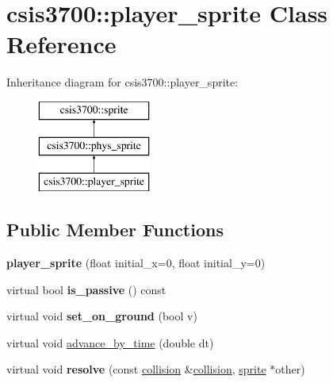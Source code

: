 \hypertarget{classcsis3700_1_1player__sprite}{\section{csis3700\-:\-:player\-\_\-sprite Class Reference}
\label{classcsis3700_1_1player__sprite}
}
Inheritance diagram for csis3700\-:\-:player\-\_\-sprite\-:\begin{figure}[H]
\begin{center}
\leavevmode
\includegraphics[height=3.000000cm]{classcsis3700_1_1player__sprite}
\end{center}
\end{figure}
\subsection*{Public Member Functions}
\begin{DoxyCompactItemize}
\item 
\hypertarget{classcsis3700_1_1player__sprite_ac187a629d01d5499a19a96e10c132aab}{{\bfseries player\-\_\-sprite} (float initial\-\_\-x=0, float initial\-\_\-y=0)}\label{classcsis3700_1_1player__sprite_ac187a629d01d5499a19a96e10c132aab}

\item 
\hypertarget{classcsis3700_1_1player__sprite_a3c25365425b909f164234f5cd6391ecc}{virtual bool {\bfseries is\-\_\-passive} () const }\label{classcsis3700_1_1player__sprite_a3c25365425b909f164234f5cd6391ecc}

\item 
\hypertarget{classcsis3700_1_1player__sprite_a2fc12d698304e7db48bee063e2cde2be}{virtual void {\bfseries set\-\_\-on\-\_\-ground} (bool v)}\label{classcsis3700_1_1player__sprite_a2fc12d698304e7db48bee063e2cde2be}

\item 
virtual void \hyperlink{classcsis3700_1_1player__sprite_ac2453e0b3934ac639d704c4ecca7493d}{advance\-\_\-by\-\_\-time} (double dt)
\item 
\hypertarget{classcsis3700_1_1player__sprite_a05d3409aa60e9eae24b696c9e9508b7a}{virtual void {\bfseries resolve} (const \hyperlink{classcsis3700_1_1collision}{collision} \&\hyperlink{classcsis3700_1_1collision}{collision}, \hyperlink{classcsis3700_1_1sprite}{sprite} $\ast$other)}\label{classcsis3700_1_1player__sprite_a05d3409aa60e9eae24b696c9e9508b7a}

\end{DoxyCompactItemize}

